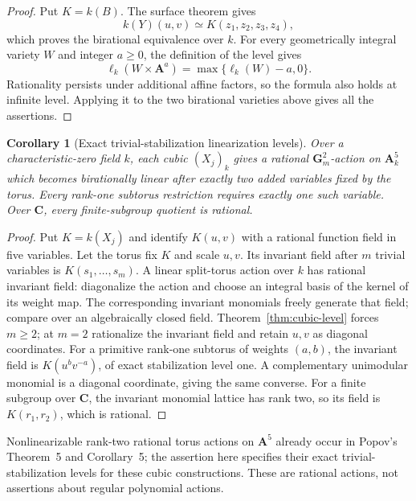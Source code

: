 \documentclass[11pt]{article}
\newtheorem{corollary}[theorem]{Corollary}
\theoremstyle{remark}
\newcommand{\A}{\mathbf A}
\newcommand{\C}{\mathbf C}
\newcommand{\Gm}{\mathbf G_m}
\begin{document}
\begin{proof}
Put \(K=k(B)\).  The surface theorem gives
\[
 k(Y)(u,v)\simeq K(z_1,z_2,z_3,z_4),
\]
which proves the birational equivalence over \(k\).
For every geometrically integral variety \(W\) and integer \(a\geq0\),
the definition of the level gives
\[
 \ell_k(W\times\A^a)=\max\{\ell_k(W)-a,0\}.
\]
Rationality persists under additional affine factors, so the formula also
holds at infinite level. Applying it to the two birational varieties above
gives all the assertions.
%
\end{proof}

\begin{corollary}[Exact trivial-stabilization linearization levels]
\label{cor:torus-linearization-level}
%
%
%
Over a characteristic-zero field \(k\), each cubic \((X_j)_k\) gives a
rational \(\Gm^2\)-action on \(\A^5_k\)
which becomes birationally linear after exactly two added variables
fixed by the torus.  Every rank-one subtorus restriction requires exactly
one such variable.  Over \(\C\), every finite-subgroup quotient is rational.
\end{corollary}

\begin{proof}
Put \(K=k(X_j)\) and identify \(K(u,v)\) with a rational function field
in five variables.  Let the torus fix \(K\) and scale \(u,v\).
Its invariant field after \(m\) trivial variables is \(K(s_1,\ldots,s_m)\).
A linear split-torus action over \(k\) has rational invariant field:
diagonalize the action and choose an integral basis of the kernel of its
weight map.  The corresponding invariant monomials freely generate that
field; compare \cite[Theorem~4 and Lemma~5]{Popov} over an algebraically
closed field.  Theorem~\ref{thm:cubic-level} forces \(m\ge2\);
at \(m=2\) rationalize the invariant field and retain \(u,v\) as diagonal
coordinates.  For a primitive rank-one subtorus of weights \((a,b)\),
the invariant field is \(K(u^bv^{-a})\), of exact stabilization level one.
A complementary unimodular monomial is a diagonal coordinate, giving the
same converse.  For a finite subgroup over \(\C\), the invariant monomial
lattice has rank two, so its field is \(K(r_1,r_2)\), which is rational.
%
%
\end{proof}

Nonlinearizable rank-two rational torus actions on \(\A^5\) already occur
in Popov's Theorem~5 and Corollary~5; the assertion here specifies their
exact trivial-stabilization levels for these cubic constructions.
These are rational actions, not assertions about regular polynomial actions.
\end{document}

